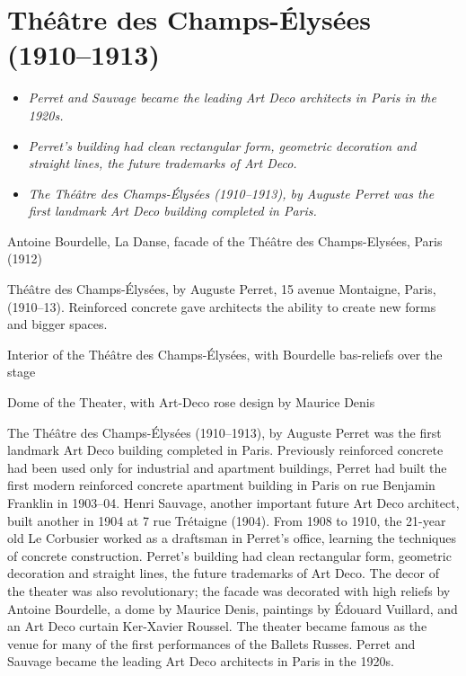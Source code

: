 \section{Théâtre des Champs-Élysées
(1910--1913)}\label{thuxe9uxe2tre-des-champs-uxe9lysuxe9es-19101913}

\begin{itemize}
\item
  \emph{Perret and Sauvage became the leading Art Deco architects in
  Paris in the 1920s.}
\item
  \emph{Perret's building had clean rectangular form, geometric
  decoration and straight lines, the future trademarks of Art Deco.}
\item
  \emph{The Théâtre des Champs-Élysées (1910--1913), by Auguste Perret
  was the first landmark Art Deco building completed in Paris.}
\end{itemize}

Antoine Bourdelle, La Danse, facade of the Théâtre des Champs-Elysées,
Paris (1912)

Théâtre des Champs-Élysées, by Auguste Perret, 15 avenue Montaigne,
Paris, (1910--13). Reinforced concrete gave architects the ability to
create new forms and bigger spaces.

Interior of the Théâtre des Champs-Élysées, with Bourdelle bas-reliefs
over the stage

Dome of the Theater, with Art-Deco rose design by Maurice Denis

The Théâtre des Champs-Élysées (1910--1913), by Auguste Perret was the
first landmark Art Deco building completed in Paris. Previously
reinforced concrete had been used only for industrial and apartment
buildings, Perret had built the first modern reinforced concrete
apartment building in Paris on rue Benjamin Franklin in 1903--04. Henri
Sauvage, another important future Art Deco architect, built another in
1904 at 7 rue Trétaigne (1904). From 1908 to 1910, the 21-year old Le
Corbusier worked as a draftsman in Perret's office, learning the
techniques of concrete construction. Perret's building had clean
rectangular form, geometric decoration and straight lines, the future
trademarks of Art Deco. The decor of the theater was also revolutionary;
the facade was decorated with high reliefs by Antoine Bourdelle, a dome
by Maurice Denis, paintings by Édouard Vuillard, and an Art Deco curtain
Ker-Xavier Roussel. The theater became famous as the venue for many of
the first performances of the Ballets Russes. Perret and Sauvage became
the leading Art Deco architects in Paris in the 1920s.

